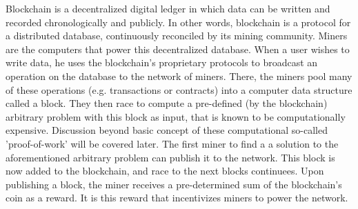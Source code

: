 Blockchain is a decentralized digital ledger in which data can be written and recorded chronologically and publicly.
In other words, blockchain is a protocol for a distributed database, continuously reconciled by its mining community.
Miners are the computers that power this decentralized database.
When a user wishes to write data, he uses the blockchain's proprietary protocols to broadcast an operation on the database
to the network of miners.
There, the miners pool many of these operations (e.g. transactions or contracts) into a computer data structure called a block.
They then race to compute a pre-defined (by the blockchain) arbitrary problem with this block as input,
that is known to be computationally expensive.
Discussion beyond basic concept of these computational so-called 'proof-of-work' will be covered later.
The first miner to find a a solution to the aforementioned arbitrary problem can publish it to the network.
This block is now added to the blockchain, and race to the next blocks continuees.
Upon publishing a block, the miner receives a pre-determined sum of the blockchain's coin as a reward.
It is this reward that incentivizes miners to power the network.
